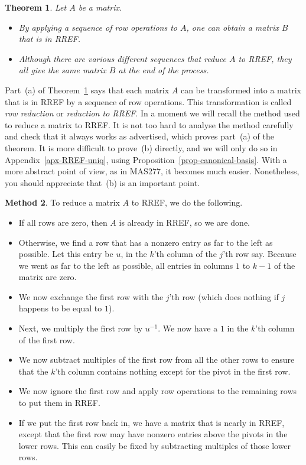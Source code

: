\documentclass[reqno]{amsart}
\newtheorem{theorem}{Theorem}[section]
\theoremstyle{definition}
\newtheorem{method}[theorem]{Method}
\begin{document}
\begin{theorem}\label{thm-RREF}
 Let $A$ be a matrix.
 \begin{itemize}
  \item[(a)] By applying a sequence of row operations to $A$, one can
   obtain a matrix $B$ that is in RREF.
  \item[(b)] Although there are various different sequences that
   reduce $A$ to RREF, they all give the same matrix $B$ at the end of
   the process.
 \end{itemize}
\end{theorem}

Part~(a) of Theorem~\ref{thm-RREF} says that each matrix $A$ can be
transformed into a matrix that is in RREF by a sequence of row
operations.  This transformation is called
\emph{row reduction}
or \emph{reduction to RREF}.
In a moment we will recall the method used to reduce a matrix to RREF.
It is not too hard to analyse the method carefully and check that it
always works as advertised, which proves part~(a) of the theorem.  It
is more difficult to prove~(b) directly, and we will only do so
in Appendix~\ref{apx-RREF-uniq}, using
Proposition~\ref{prop-canonical-basis}.  With a more abstract point of
view, as in MAS277, it becomes much easier.  Nonetheless, you should
appreciate that~(b) is an important point.

\begin{method}\label{meth-RREF}
 To reduce a matrix $A$ to RREF, we do the following.
 \begin{itemize}
  \item[(a)] If all rows are zero, then $A$ is already in RREF, so we
   are done.
  \item[(b)] Otherwise, we find a row that has a nonzero entry as far
   to the left as possible.  Let this entry be $u$, in the $k$'th
   column of the $j$'th row say.  Because we went as far to the left
   as possible, all entries in columns $1$ to $k-1$ of the matrix are
   zero.
  \item[(c)] We now exchange the first row with the $j$'th row (which
   does nothing if $j$ happens to be equal to $1$).
  \item[(d)] Next, we multiply the first row by $u^{-1}$.  We now have
   a $1$ in the $k$'th column of the first row.
  \item[(e)] We now subtract multiples of the first row from all the
   other rows to ensure that the $k$'th column contains nothing except
   for the pivot in the first row.
  \item[(f)] We now ignore the first row and apply row operations to
   the remaining rows to put them in RREF.
  \item[(g)] If we put the first row back in, we have a matrix that is
   nearly in RREF, except that the first row may have nonzero entries
   above the pivots in the lower rows.  This can easily be fixed by
   subtracting multiples of those lower rows.
 \end{itemize}
\end{method}
\end{document}
